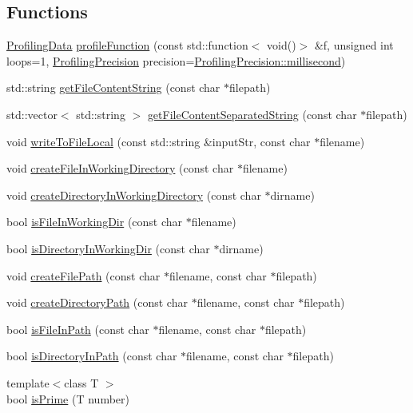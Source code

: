 \subsection*{Functions}
\begin{DoxyCompactItemize}
\item 
\mbox{\hyperlink{structutl_1_1_profiling_data}{Profiling\+Data}} \mbox{\hyperlink{namespaceutl_a7a49e569588dd5840a41906b2b347380}{profile\+Function}} (const std\+::function$<$ void()$>$ \&f, unsigned int loops=1, \mbox{\hyperlink{namespaceutl_ad221bb3fac593651670bdc0263b92707}{Profiling\+Precision}} precision=\mbox{\hyperlink{namespaceutl_ad221bb3fac593651670bdc0263b92707a407aa8403e413c457b081a9dc095a285}{Profiling\+Precision\+::millisecond}})
\item 
std\+::string \mbox{\hyperlink{namespaceutl_a8ee3ec7274b0811ca49ec96d4cfc8346}{get\+File\+Content\+String}} (const char $\ast$filepath)
\item 
std\+::vector$<$ std\+::string $>$ \mbox{\hyperlink{namespaceutl_ad5cc7d9f2d66b160d610e1786c898371}{get\+File\+Content\+Separated\+String}} (const char $\ast$filepath)
\item 
void \mbox{\hyperlink{namespaceutl_a39cf4bd9ebce7d12a9acca32edc2ac8d}{write\+To\+File\+Local}} (const std\+::string \&input\+Str, const char $\ast$filename)
\item 
void \mbox{\hyperlink{namespaceutl_a26917cac96f0f1a729f066a7f6d1f4aa}{create\+File\+In\+Working\+Directory}} (const char $\ast$filename)
\item 
void \mbox{\hyperlink{namespaceutl_ae0a8bbde71249285ee7ac90e3263d5d7}{create\+Directory\+In\+Working\+Directory}} (const char $\ast$dirname)
\item 
bool \mbox{\hyperlink{namespaceutl_ad8dd27d1a79413de101202470970755c}{is\+File\+In\+Working\+Dir}} (const char $\ast$filename)
\item 
bool \mbox{\hyperlink{namespaceutl_a45a8640044d9ad8216c1495249ce6ed1}{is\+Directory\+In\+Working\+Dir}} (const char $\ast$dirname)
\item 
void \mbox{\hyperlink{namespaceutl_aec92e28ae2ed3f04cafaddc0d9287e70}{create\+File\+Path}} (const char $\ast$filename, const char $\ast$filepath)
\item 
void \mbox{\hyperlink{namespaceutl_a86eca520cbeb7861e95c4054b86818be}{create\+Directory\+Path}} (const char $\ast$filename, const char $\ast$filepath)
\item 
bool \mbox{\hyperlink{namespaceutl_a65f2cad7adb77020d86898720bde9b9c}{is\+File\+In\+Path}} (const char $\ast$filename, const char $\ast$filepath)
\item 
bool \mbox{\hyperlink{namespaceutl_a974c3394d6d0a5dd2ec596d5eab86c52}{is\+Directory\+In\+Path}} (const char $\ast$filename, const char $\ast$filepath)
\item 
{\footnotesize template$<$class T $>$ }\\bool \mbox{\hyperlink{namespaceutl_ad79105f1343d47a6ebfb4b246b653dae}{is\+Prime}} (T number)
\end{DoxyCompactItemize}


